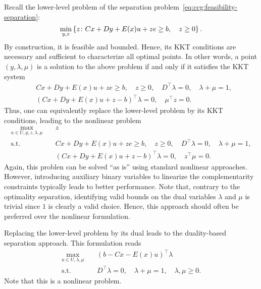 Recall the lower-level problem of the separation
problem~\eqref{eq:ccg:feasibility-separation}:
\begin{equation*}
    \min_{y,z} \left\{ z \colon
        Cx + Dy + E(x)u + ze \ge b, \quad 
        z \ge 0
    \right\}.
\end{equation*}
By construction, it is feasible and bounded. Hence, its KKT conditions are
necessary and sufficient to characterize all optimal points. In other words, a
point $(y,\lambda,\mu)$ is a solution to the above problem if and only if it
satisfies the KKT system 
\begin{align*}
    & Cx + Dy + E(x)u + ze \ge b, \quad z \ge 0, \quad 
    D^\top \lambda = 0, \quad \lambda + \mu = 1, \\
    & (Cx + Dy + E(x)u + z - b)^\top\lambda = 0, \quad \mu^\top z = 0.
\end{align*}
Thus, one can equivalently replace the lower-level problem by its KKT
conditions, leading to the nonlinear problem 
\begin{align*}
    \max_{u\in U,y,z,\lambda,\mu} \quad & z \\
    \text{s.t.} \quad 
    & Cx + Dy + E(x)u + ze \ge b, \quad z \ge 0, \quad 
    D^\top \lambda = 0, \quad \lambda + \mu = 1, \\
    & (Cx + Dy + E(x)u + z - b)^\top\lambda = 0, \quad z^\top\mu = 0.
\end{align*}
Again, this problen can be solved ``as is'' using standard nonlinear
approaches. However, introducing auxiliary binary variables to linearize the
complementarity constraints typically leads to better performance. Note that,
contrary to the optimality separation, identifying valid bounds on the dual
variables $\lambda$ and $\mu$ is trivial since $1$ is clearly a valid choice.
Hence, this approach should often be preferred over the nonlinear formulation. 


Replacing the lower-level problem by its dual leads to the duality-based
separation approach. This formulation reads 
\begin{align*}
    \max_{u\in U,\lambda,\mu} \quad & (b - Cx - E(x)u)^\top\lambda \\
    \text{s.t.} \quad
    & D^\top\lambda = 0, \quad \lambda + \mu = 1, \quad \lambda,\mu\ge 0.
\end{align*}
Note that this is a nonlinear problem.


